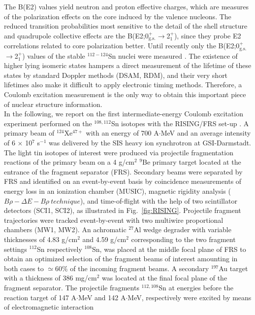 \documentclass[aps,prc,twocolumn,amssymb,showpacs]{revtex4}
\begin{document}
The B(E2) values yield neutron and proton effective charges, which
are measures of the polarization effects on the core induced by
the valence nucleons. The reduced transition probabilities most
sensitive to the detail of the shell structure and quadrupole
collective effects are the
B(E2;0$^+_{\text{g.s.}}$$\rightarrow$2$^+_1$), since they probe E2
correlations related to core polarization better. Until recently
only the B(E2;0$^+_{\text{g.s.}}$$\rightarrow$2$^+_1$) values of
the stable $^{112-124}$Sn nuclei were measured \cite{ram01}. The
existence of higher lying isomeric states hampers a direct
measurement of the lifetime of these states by standard Doppler
methods (DSAM, RDM), and their very short lifetimes also make it
difficult to apply electronic timing methods. Therefore, a Coulomb
excitation measurement is the only way to obtain this important
piece of nuclear structure information.\\
In the following, we report on the first intermediate-energy
Coulomb excitation experiment performed on the $^{108,112}$Sn
isotopes with the RISING/FRS set-up \cite{wol05}. A primary beam
of $^{124}$Xe$^{47+}$ with an energy of 700 A$\cdot$MeV and an
average intensity of 6 $\times$ 10$^7$ s$^{-1}$ was delivered by
the SIS heavy ion synchrotron at GSI-Darmstadt. The light tin
isotopes of interest were produced via projectile fragmentation
reactions of the primary beam on a 4 g/cm$^2$ $^9$Be primary
target located at the entrance of the fragment separator (FRS).
Secondary beams were separated by FRS and identified on an
event-by-event basis by coincidence measurements of energy loss in
an ionization chamber (MUSIC), magnetic rigidity analysis
($B\rho-\Delta E-B\rho\ technique$), and time-of-flight with the
help of two scintillator detectors (SCI1, SCI2), as illustrated in
Fig.~\ref{fig:RISING}. Projectile fragment trajectories were
tracked event-by-event with two multiwire proportional chambers
(MW1, MW2). An achromatic $^{27}$Al wedge degrader with variable
thicknesses of 4.83 g/cm$^2$ and 4.59 g/cm$^2$ corresponding to
the two fragment settings $^{112}$Sn respectively $^{108}$Sn, was
placed at the middle focal plane of FRS to obtain an optimized
selection of the fragment beams of interest amounting in both
cases to $\simeq 60 \%$ of the incoming fragment beams. A
secondary $^{197}$Au target with a thickness of 386 mg/cm$^2$ was
located at the final focal plane of the fragment separator. The
projectile fragments $^{112,108}$Sn at energies before the
reaction target of 147 A$\cdot$MeV and 142 A$\cdot$MeV,
respectively were excited by means of electromagnetic interaction
\end{document}
